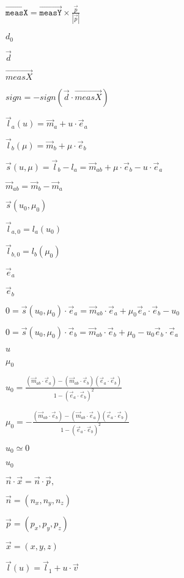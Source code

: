 \documentclass{article}
\begin{document}
$ \vec{\texttt{measX}} = \vec{\texttt{measY}} \times \frac{\vec{p}}{|\vec{p}|} $
\pagebreak

$ d_{0} $
\pagebreak

$ \vec{d} $
\pagebreak

$ \vec{measX} $
\pagebreak

$ sign = -sign(\vec{d} \cdot \vec{measX}) $
\pagebreak

$ \vec l_{a}(u) = \vec m_a + u \cdot \vec e_{a} $
\pagebreak

$ \vec l_{b}(\mu) = \vec m_b + \mu \cdot \vec e_{b} $
\pagebreak

$ \vec s(u, \mu) = \vec l_{b} - l_{a} = \vec m_{ab} + \mu \cdot \vec e_{b} - u \cdot \vec e_{a} $
\pagebreak

$ \vec m_{ab} = \vec m_{b} - \vec m_{a} $
\pagebreak

$ \vec s(u_0, \mu_0) $
\pagebreak

$ \vec l_{a,0} = l_{a}(u_0) $
\pagebreak

$ \vec l_{b,0} = l_{b}(\mu_0) $
\pagebreak

$ \vec e_{a} $
\pagebreak

$ \vec e_{b} $
\pagebreak

$ 0 = \vec s(u_0, \mu_0) \cdot \vec e_a = \vec m_{ab} \cdot \vec e_a + \mu_0 \vec e_a \cdot \vec e_b - u_0 $
\pagebreak

$ 0 = \vec s(u_0, \mu_0) \cdot \vec e_b = \vec m_{ab} \cdot \vec e_b + \mu_0 - u_0 \vec e_b \cdot \vec e_a $
\pagebreak

$ u $
\pagebreak

$ \mu_0 $
\pagebreak

$ u_0 = \frac{(\vec m_{ab} \cdot \vec e_a)-(\vec m_{ab} \cdot \vec e_b)(\vec e_a \cdot \vec e_b)}{1-(\vec e_a \cdot \vec e_b)^2} $
\pagebreak

$ \mu_0 = - \frac{(\vec m_{ab} \cdot \vec e_b)-(\vec m_{ab} \cdot \vec e_a)(\vec e_a \cdot \vec e_b)}{1-(\vec e_a \cdot \vec e_b)^2} $
\pagebreak

$ u_0 \simeq 0$
\pagebreak

$ u_0 $
\pagebreak

$ \vec n \cdot \vec x = \vec n \cdot \vec p,$
\pagebreak

$ \vec n = (n_{x}, n_{y}, n_{z})$
\pagebreak

$ \vec p = (p_{x}, p_{y}, p_{z})$
\pagebreak

$ \vec x = (x,y,z) $
\pagebreak

$ \vec l(u) = \vec l_{1} + u \cdot \vec v $
\pagebreak
\end{document}
